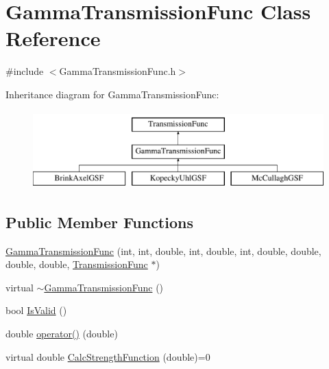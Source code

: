\hypertarget{classGammaTransmissionFunc}{\section{Gamma\-Transmission\-Func Class Reference}
\label{classGammaTransmissionFunc}
}


{\ttfamily \#include $<$Gamma\-Transmission\-Func.\-h$>$}

Inheritance diagram for Gamma\-Transmission\-Func\-:\begin{figure}[H]
\begin{center}
\leavevmode
\includegraphics[height=3.000000cm]{dc/d71/classGammaTransmissionFunc}
\end{center}
\end{figure}
\subsection*{Public Member Functions}
\begin{DoxyCompactItemize}
\item 
\hyperlink{classGammaTransmissionFunc_a85c3c4d8857b66b3ba90e63366b550de}{Gamma\-Transmission\-Func} (int, int, double, int, double, int, double, double, double, double, \hyperlink{classTransmissionFunc}{Transmission\-Func} $\ast$)
\item 
virtual \hyperlink{classGammaTransmissionFunc_a5a64da635792941c23cc8eff82b6d235}{$\sim$\-Gamma\-Transmission\-Func} ()
\item 
bool \hyperlink{classGammaTransmissionFunc_aa7947446f3b83320717dd1ca48d48055}{Is\-Valid} ()
\item 
double \hyperlink{classGammaTransmissionFunc_a95be997a9a55e9f56fd00641146ff795}{operator()} (double)
\item 
virtual double \hyperlink{classGammaTransmissionFunc_a68156d72ed9620f66f96dc37bbf781aa}{Calc\-Strength\-Function} (double)=0
\end{DoxyCompactItemize}
